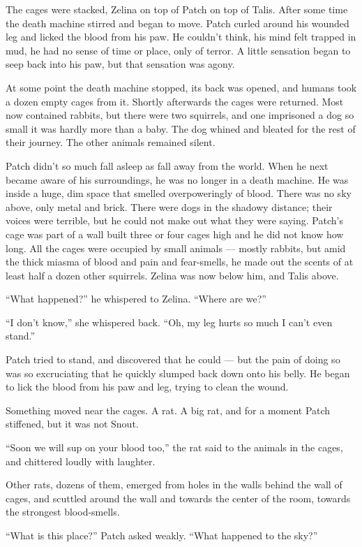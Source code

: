 \documentclass[12pt]{memoir}
\begin{document}
The cages were stacked, Zelina on top of Patch on top of Talis. After
some time the death machine stirred and began to move. Patch curled
around his wounded leg and licked the blood from his paw. He couldn’t
think, his mind felt trapped in mud, he had no sense of time or place,
only of terror. A little sensation began to seep back into his paw,
but that sensation was agony.

At some point the death machine stopped, its back was opened, and
humans took a dozen empty cages from it. Shortly afterwards the cages
were returned. Most now contained rabbits, but there were two
squirrels, and one imprisoned a dog so small it was hardly more than a
baby. The dog whined and bleated for the rest of their journey. The
other animals remained silent.

Patch didn’t so much fall asleep as fall away from the world. When he
next became aware of his surroundings, he was no longer in a death
machine. He was inside a huge, dim space that smelled overpoweringly
of blood. There was no sky above, only metal and brick. There were
dogs in the shadowy distance; their voices were terrible, but he could
not make out what they were saying. Patch’s cage was part of a wall
built three or four cages high and he did not know how long. All the
cages were occupied by small animals — mostly rabbits, but amid the
thick miasma of blood and pain and fear-smells, he made out the scents
of at least half a dozen other squirrels. Zelina was now below him,
and Talis above.

“What happened?” he whispered to Zelina. “Where are we?”

“I don’t know,” she whispered back. “Oh, my leg hurts so much I can’t
even stand.”

Patch tried to stand, and discovered that he could — but the pain of
doing so was so excruciating that he quickly slumped back down onto
his belly. He began to lick the blood from his paw and leg, trying to
clean the wound.

Something moved near the cages. A rat. A big rat, and for a moment
Patch stiffened, but it was not Snout.

“Soon we will sup on your blood too,” the rat said to the animals in
the cages, and chittered loudly with laughter.

Other rats, dozens of them, emerged from holes in the walls behind the
wall of cages, and scuttled around the wall and towards the center of
the room, towards the strongest blood-smells.

“What is this place?” Patch asked weakly. “What happened to the sky?”
\end{document}
